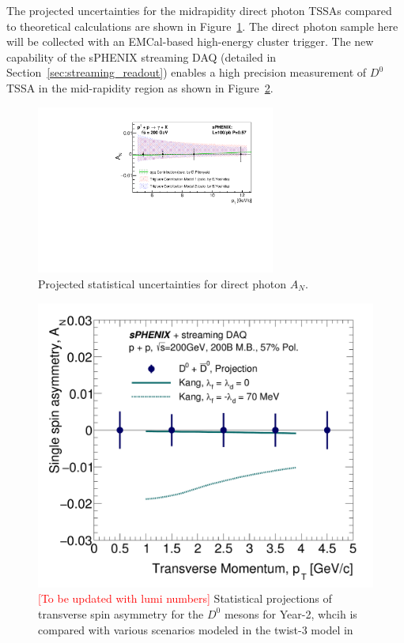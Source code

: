 The projected uncertainties for the midrapidity direct photon TSSAs compared to theoretical calculations are shown in Figure~\ref{fig:AN_dp}. The direct photon sample here will be collected with an EMCal-based high-energy cluster trigger. 
The new capability of the sPHENIX streaming DAQ (detailed in
Section~\ref{sec:streaming_readout}) enables a high precision
measurement of $D^0$ TSSA in the mid-rapidity region as shown in
Figure~\ref{fig:AN-D0year20232025}. 

\begin{figure}[htbp]
\centering
\includegraphics[width=0.70\textwidth]{figs/AN_dp_sphenix.pdf}
\caption{Projected statistical uncertainties for direct photon $A_N$.}
\label{fig:AN_dp}
\end{figure}

\begin{figure}[htbp]
\begin{center}
\includegraphics[width=.49\linewidth]{figs/RAA_DB_theory_root_AN_D0D0bar_pp200B.pdf}
\caption{{\textcolor{red}{[To be updated with lumi numbers]}} Statistical projections of
  transverse spin asymmetry for the $D^0$ mesons for Year-2, whcih is compared with various scenarios modeled in the twist-3 model in~\cite{Kang:2008ih}} 
\label{fig:AN-D0year20232025}
\end{center}
\end{figure}

